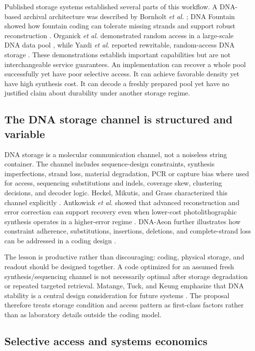 \documentclass[conference]{IEEEtran}
\begin{document}
Published storage systems established several parts of this workflow. A DNA-based archival architecture was described by Bornholt \textit{et al.} \cite{bornholt2016}; DNA Fountain showed how fountain coding can tolerate missing strands and support robust reconstruction \cite{erlich2017}. Organick \textit{et al.} demonstrated random access in a large-scale DNA data pool \cite{organick2018}, while Yazdi \textit{et al.} reported rewritable, random-access DNA storage \cite{yazdi2015}. These demonstrations establish important capabilities but are not interchangeable service guarantees. An implementation can recover a whole pool successfully yet have poor selective access. It can achieve favorable density yet have high synthesis cost. It can decode a freshly prepared pool yet have no justified claim about durability under another storage regime.

\subsection{The DNA storage channel is structured and variable}

DNA storage is a molecular communication channel, not a noiseless string container. The channel includes sequence-design constraints, synthesis imperfections, strand loss, material degradation, PCR or capture bias where used for access, sequencing substitutions and indels, coverage skew, clustering decisions, and decoder logic. Heckel, Mikutis, and Grass characterized this channel explicitly \cite{heckel2019}. Antkowiak \textit{et al.} showed that advanced reconstruction and error correction can support recovery even when lower-cost photolithographic synthesis operates in a higher-error regime \cite{antkowiak2020}. DNA-Aeon further illustrates how constraint adherence, substitutions, insertions, deletions, and complete-strand loss can be addressed in a coding design \cite{welzel2023}.

The lesson is productive rather than discouraging: coding, physical storage, and readout should be designed together. A code optimized for an assumed fresh synthesis/sequencing channel is not necessarily optimal after storage degradation or repeated targeted retrieval. Matange, Tuck, and Keung emphasize that DNA stability is a central design consideration for future systems \cite{matange2021}. The proposal therefore treats storage condition and access pattern as first-class factors rather than as laboratory details outside the coding model.

\subsection{Selective access and systems economics}
\end{document}
